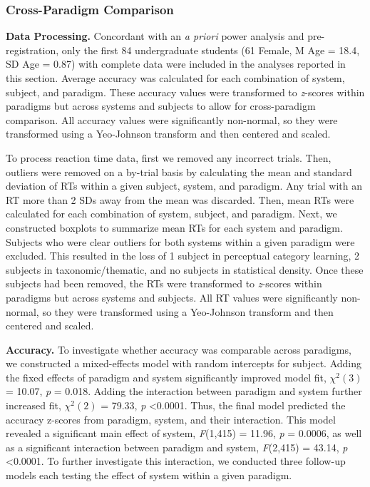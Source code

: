 \documentclass[../dissertation.tex]{subfiles}
\begin{document}
\subsubsection{Cross-Paradigm Comparison}
\textbf{Data Processing.} Concordant with an \textit{a priori} power analysis and pre-registration, only the first 84 undergraduate students (61 Female, M Age = 18.4, SD Age = 0.87) with complete data were included in the analyses reported in this section. Average accuracy was calculated for each combination of system, subject, and paradigm. These accuracy values were transformed to \textit{z}-scores within paradigms but across systems and subjects to allow for cross-paradigm comparison. All accuracy values were significantly non-normal, so they were transformed using a Yeo-Johnson transform and then centered and scaled. \par
	To process reaction time data, first we removed any incorrect trials. Then, outliers were removed on a by-trial basis by calculating the mean and standard deviation of RTs within a given subject, system, and paradigm. Any trial with an RT more than 2 SDs away from the mean was discarded. Then, mean RTs were calculated for each combination of system, subject, and paradigm. Next, we constructed boxplots to summarize mean RTs for each system and paradigm. Subjects who were clear outliers for both systems within a given paradigm were excluded. This resulted in the loss of 1 subject in perceptual category learning, 2 subjects in taxonomic/thematic, and no subjects in statistical density. Once these subjects had been removed, the RTs were transformed to \textit{z}-scores within paradigms but across systems and subjects. All RT values were significantly non-normal, so they were transformed using a Yeo-Johnson transform and then centered and scaled. \par
	\textbf{Accuracy.} To investigate whether accuracy was comparable across paradigms, we constructed a mixed-effects model with random intercepts for subject. Adding the fixed effects of paradigm and system significantly improved model fit, $\chi^{2}(3)$ = 10.07, \textit{p} = 0.018. Adding the interaction between paradigm and system further increased fit, $\chi^{2}(2)$ = 79.33, \textit{p} \textless 0.0001. Thus, the final model predicted the accuracy z-scores from paradigm, system, and their interaction. This model revealed a significant main effect of system, \textit{F}(1,415) = 11.96, \textit{p} = 0.0006, as well as a significant interaction between paradigm and system, \textit{F}(2,415) = 43.14, \textit{p} \textless 0.0001. To further investigate this interaction, we conducted three follow-up models each testing the effect of system within a given paradigm. \par
\end{document}
